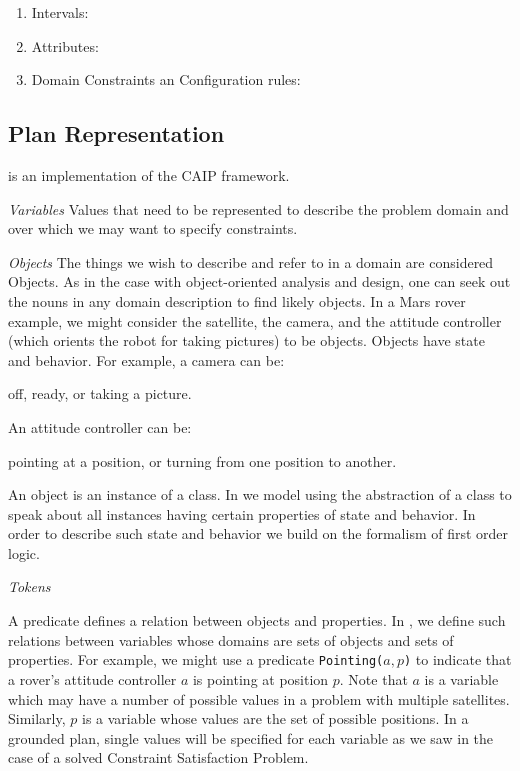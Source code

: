 \begin{enumerate}
	\item Intervals: 
	\item Attributes:
	\item Domain Constraints an Configuration rules:
\end{enumerate}


\subsection{\eu Plan Representation}
\label{sec:europa:pr}

\eu is an implementation of the CAIP framework. 


\textit{Variables} Values that need to be represented to describe the
problem domain and over which we may want to specify constraints.

\textit{Objects} The things we wish to describe and refer to in a
domain are considered Objects. As in the case with object-oriented
analysis and design, one can seek out the nouns in any domain
description to find likely objects. In a Mars rover example, we might
consider the satellite, the camera, and the attitude controller (which
orients the robot for taking pictures) to be objects. Objects have
state and behavior. For example, a camera can be:

    off,
    ready, or
    taking a picture. 

An attitude controller can be:

    pointing at a position, or
    turning from one position to another. 

    An object is an instance of a class. In \eu we model using the
    abstraction of a class to speak about all instances having certain
    properties of state and behavior. In order to describe such state
    and behavior we build on the formalism of first order logic.


\textit{Tokens}

A predicate defines a relation between objects and properties. In \eu,
we define such relations between variables whose domains are sets of
objects and sets of properties. For example, we might use a predicate
\texttt{Pointing($a,p$)} to indicate that a rover's attitude controller
$a$ is pointing at position $p$. Note that $a$ is a variable which may
have a number of possible values in a problem with multiple
satellites. Similarly, $p$ is a variable whose values are the set of
possible positions. In a grounded plan, single values will be
specified for each variable as we saw in the case of a solved
Constraint Satisfaction Problem.

